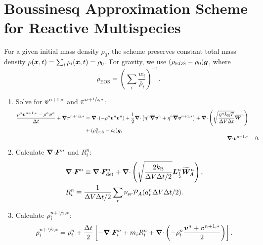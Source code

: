 \documentclass[
10pt
showpacs, showkeys,
amsmath,amssymb,
aps,
pre,
floatfix,
]{revtex4-1}
\newcommand{\divg}{{\V\nabla\cdot}}                       %
\begin{document}
\section*{Boussinesq Approximation Scheme for Reactive Multispecies}

\noindent For a given initial mass density $\rho_0$, the scheme preserves constant total mass density $\rho(\boldsymbol{x},t)=\sum_i \rho_i(\boldsymbol{x},t)=\rho_0$.
For gravity, we use $(\rho_\mathrm{EOS} - \rho_0)\boldsymbol{g}$, where
\begin{equation}
\rho_\mathrm{EOS} = \left(\sum_i \frac{w_i}{\bar{\rho}_i}\right)^{-1}.
\end{equation}

\begin{enumerate}

\item Solve for $\boldsymbol{v}^{n+1,*}$ and $\pi^{n+\sfrac{1}{2},*}$:
\begin{align}
\label{boussinesq_stokes_v_1st}
\begin{split}
\frac{\rho^n\V{v}^{n+1,*}-\rho^n\V{v}^n}{\D{t}} + \grad\pi^{n+\myhalf,*}
& = \divg\left(-\rho^n\V{v}^n\V{v}^n\right) + 
\frac{1}{2}\divg\left( \eta^n \overline{\grad}\V{v}^n + \eta^n \overline{\grad}\V{v}^{n+1,*} \right)
+ \divg\left( \sqrt{\frac{\eta^n k_\mathrm{B}T}{\D{V}\D{t}} } \overline{\V{W}}^n \right)
\\
& + (\rho^n_\mathrm{EOS}-\rho_0)\V{g},
\end{split}
\\
\label{boussinesq_stokes_p_1st}
\divg\V{v}^{n+1,*} & = 0.
\end{align}

\item Calculate $\divg\V{F}^n$ and $R^n_i$:
\begin{align}
\label{boussinesq_fluxdiv_2nd}
& \divg\V{F}^n \equiv \divg\V{F}_\mathrm{det}^n + \divg\left( \sqrt{ \frac{2k_\mathrm{B}}{\D{V}\D{t}/2} } \V{L}^n_{\frac12} \widetilde{\V{W}}^n_A \right), \\
\label{boussinesq_chemrate_2nd}
& R^n_i \equiv \frac{1}{\D{V}\D{t}/2}\sum_r \nu_{sr}\mathcal{P}_A(a^n_r\D{V}\D{t}/2).
\end{align}

\item Calculate $\rho^{n+\sfrac{1}{2},*}_i$:
\begin{equation}
\rho^{n+\myhalf,*}_i = \rho^n_i + \frac{\D{t}}{2} \left[ -\divg\V{F}^n_i + m_i R^n_i + \divg\left( -\rho^n_i \frac{\V{v}^n+\V{v}^{n+1,*}}{2} \right) \right].
\end{equation}


\end{enumerate}
\end{document}
